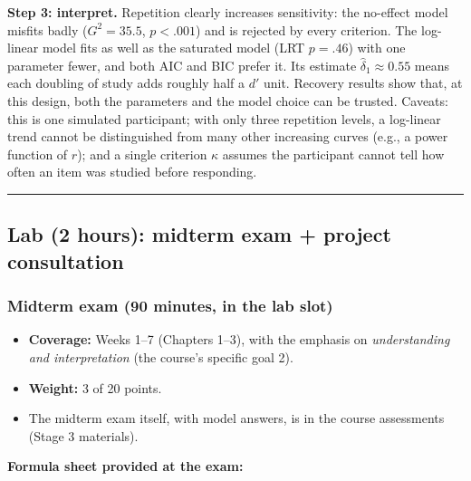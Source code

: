 \textbf{Step 3: interpret.} Repetition clearly increases sensitivity:
the no-effect model misfits badly (\(G^2 = 35.5\), \(p < .001\)) and is
rejected by every criterion. The log-linear model fits as well as the
saturated model (LRT \(p = .46\)) with one parameter fewer, and both AIC
and BIC prefer it. Its estimate \(\hat\delta_1 \approx 0.55\) means each
doubling of study adds roughly half a \(d'\) unit. Recovery results show
that, at this design, both the parameters and the model choice can be
trusted. Caveats: this is one simulated participant; with only three
repetition levels, a log-linear trend cannot be distinguished from many
other increasing curves (e.g., a power function of \(r\)); and a single
criterion \(\kappa\) assumes the participant cannot tell how often an
item was studied before responding.

\begin{center}\rule{0.5\linewidth}{0.5pt}\end{center}


\subsection{Lab (2 hours): midterm exam + project consultation}

\subsubsection{Midterm exam (90 minutes, in the lab slot)}

\begin{itemize}
\tightlist
\item
  \textbf{Coverage:} Weeks 1--7 (Chapters 1--3), with the emphasis on
  \emph{understanding and interpretation} (the course's specific goal
  2).
\item
  \textbf{Weight:} 3 of 20 points.
\item
  The midterm exam itself, with model answers, is in the course
  assessments (Stage 3 materials).
\end{itemize}

\textbf{Formula sheet provided at the exam:}

